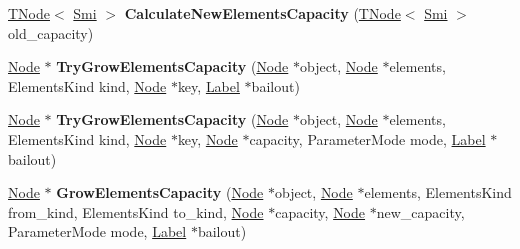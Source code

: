\begin{DoxyCompactItemize}
\item 
\mbox{\label{classv8_1_1internal_1_1CodeStubAssembler_a30f38b2fdd1c347b4d2a0a62a4cc593c}} 
\mbox{\hyperlink{classv8_1_1internal_1_1compiler_1_1TNode}{T\+Node}}$<$ \mbox{\hyperlink{classv8_1_1internal_1_1Smi}{Smi}} $>$ {\bfseries Calculate\+New\+Elements\+Capacity} (\mbox{\hyperlink{classv8_1_1internal_1_1compiler_1_1TNode}{T\+Node}}$<$ \mbox{\hyperlink{classv8_1_1internal_1_1Smi}{Smi}} $>$ old\+\_\+capacity)
\item 
\mbox{\label{classv8_1_1internal_1_1CodeStubAssembler_adaf7b6c454aa1775f6edb88c4085411b}} 
\mbox{\hyperlink{classv8_1_1internal_1_1compiler_1_1Node}{Node}} $\ast$ {\bfseries Try\+Grow\+Elements\+Capacity} (\mbox{\hyperlink{classv8_1_1internal_1_1compiler_1_1Node}{Node}} $\ast$object, \mbox{\hyperlink{classv8_1_1internal_1_1compiler_1_1Node}{Node}} $\ast$elements, Elements\+Kind kind, \mbox{\hyperlink{classv8_1_1internal_1_1compiler_1_1Node}{Node}} $\ast$key, \mbox{\hyperlink{classv8_1_1internal_1_1compiler_1_1CodeAssemblerLabel}{Label}} $\ast$bailout)
\item 
\mbox{\label{classv8_1_1internal_1_1CodeStubAssembler_aafc26034794e1ce3b3e5707165d0951d}} 
\mbox{\hyperlink{classv8_1_1internal_1_1compiler_1_1Node}{Node}} $\ast$ {\bfseries Try\+Grow\+Elements\+Capacity} (\mbox{\hyperlink{classv8_1_1internal_1_1compiler_1_1Node}{Node}} $\ast$object, \mbox{\hyperlink{classv8_1_1internal_1_1compiler_1_1Node}{Node}} $\ast$elements, Elements\+Kind kind, \mbox{\hyperlink{classv8_1_1internal_1_1compiler_1_1Node}{Node}} $\ast$key, \mbox{\hyperlink{classv8_1_1internal_1_1compiler_1_1Node}{Node}} $\ast$capacity, Parameter\+Mode mode, \mbox{\hyperlink{classv8_1_1internal_1_1compiler_1_1CodeAssemblerLabel}{Label}} $\ast$bailout)
\item 
\mbox{\label{classv8_1_1internal_1_1CodeStubAssembler_aaa92bc63e69393eacadaab1ec57fa2c3}} 
\mbox{\hyperlink{classv8_1_1internal_1_1compiler_1_1Node}{Node}} $\ast$ {\bfseries Grow\+Elements\+Capacity} (\mbox{\hyperlink{classv8_1_1internal_1_1compiler_1_1Node}{Node}} $\ast$object, \mbox{\hyperlink{classv8_1_1internal_1_1compiler_1_1Node}{Node}} $\ast$elements, Elements\+Kind from\+\_\+kind, Elements\+Kind to\+\_\+kind, \mbox{\hyperlink{classv8_1_1internal_1_1compiler_1_1Node}{Node}} $\ast$capacity, \mbox{\hyperlink{classv8_1_1internal_1_1compiler_1_1Node}{Node}} $\ast$new\+\_\+capacity, Parameter\+Mode mode, \mbox{\hyperlink{classv8_1_1internal_1_1compiler_1_1CodeAssemblerLabel}{Label}} $\ast$bailout)

\end{DoxyCompactItemize}
